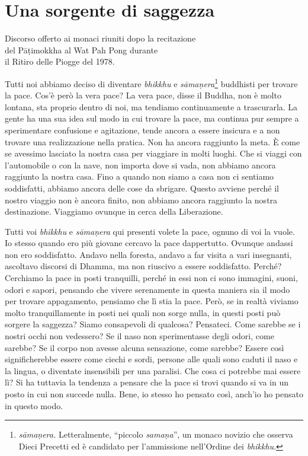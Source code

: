 \chapter{Una sorgente di saggezza}

\begin{openingQuote}
  \centering

  Discorso offerto ai monaci riuniti dopo la recitazione\\
  del Pāṭimokkha al Wat Pah Pong durante\\
  il Ritiro delle Piogge del 1978.
\end{openingQuote}

Tutti noi abbiamo deciso di diventare \emph{bhikkhu} e
\emph{sāmaṇera}\footnote{\emph{sāmaṇera.} Letteralmente, ``piccolo
  \emph{samaṇa}'', un monaco novizio che osserva Dieci Precetti ed è
  candidato per l'ammissione nell'Ordine dei \emph{bhikkhu}.} buddhisti
per trovare la pace. Cos'è però la vera pace? La vera pace, disse il
Buddha, non è molto lontana, sta proprio dentro di noi, ma tendiamo
continuamente a trascurarla. La gente ha una sua idea sul modo in cui
trovare la pace, ma continua pur sempre a sperimentare confusione e
agitazione, tende ancora a essere insicura e a non trovare una
realizzazione nella pratica. Non ha ancora raggiunto la meta. È come se
avessimo lasciato la nostra casa per viaggiare in molti luoghi. Che si
viaggi con l'automobile o con la nave, non importa dove si vada, non
abbiamo ancora raggiunto la nostra casa. Fino a quando non siamo a casa
non ci sentiamo soddisfatti, abbiamo ancora delle cose da sbrigare.
Questo avviene perché il nostro viaggio non è ancora finito, non abbiamo
ancora raggiunto la nostra destinazione. Viaggiamo ovunque in cerca
della Liberazione.

Tutti voi \emph{bhikkhu} e \emph{sāmaṇera} qui presenti volete la pace,
ognuno di voi la vuole. Io stesso quando ero più giovane cercavo la pace
dappertutto. Ovunque andassi non ero soddisfatto. Andavo nella foresta,
andavo a far visita a vari insegnanti, ascoltavo discorsi di Dhamma, ma
non riuscivo a essere soddisfatto. Perché? Cerchiamo la pace in posti
tranquilli, perché in essi non ci sono immagini, suoni, odori e sapori,
pensando che vivere serenamente in questa maniera sia il modo per
trovare appagamento, pensiamo che lì stia la pace. Però, se in realtà
viviamo molto tranquillamente in posti nei quali non sorge nulla, in
questi posti può sorgere la saggezza? Siamo consapevoli di qualcosa?
Pensateci. Come sarebbe se i nostri occhi non vedessero? Se il naso non
sperimentasse degli odori, come sarebbe? Se il corpo non avesse alcuna
sensazione, come sarebbe? Essere così significherebbe essere come ciechi
e sordi, persone alle quali sono caduti il naso e la lingua, o diventate
insensibili per una paralisi. Che cosa ci potrebbe mai essere lì? Si ha
tuttavia la tendenza a pensare che la pace si trovi quando si va in un
posto in cui non succede nulla. Bene, io stesso ho pensato così, anch'io
ho pensato in questo modo.

